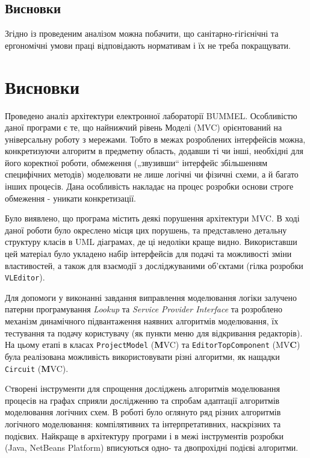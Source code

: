 \documentclass[12pt,a4paper]{article}
\begin{document}
\subsection{Висновки}
Згідно із проведеним аналізом можна побачити, що санітарно-гігієнічні та ергономічні умови праці відповідають нормативам і їх не треба покращувати. 

\clearpage
 
\section{Висновки}

Проведено аналіз архітектури електронної лабораторії BUMMEL. Особливістю даної програми є те, що найнижчий рівень Моделі (MVC) орієнтований на універсальну роботу з мережами. Тобто в межах розроблених інтерфейсів можна, конкретизуючи алгоритм в предметну область, додавши ті чи інші, необхідні для його коректної роботи, обмеження („звузивши“ інтерфейс збільшенням специфічних методів) моделювати не лише логічні чи фізичні схеми, а й багато інших процесів. Дана особливість накладає на процес розробки основи строге обмеження - уникати конкретизації.

Було виявлено, що програма містить деякі порушення архітектури MVC. В ході даної роботи було окреслено місця цих порушень, та представлено детальну структуру класів в UML діаграмах, де ці недоліки краще видно. Використавши цей матеріал було укладено набір інтерфейсів для подачі та можливості зміни властивостей, а також для взаємодії з досліджуваними об’єктами (гілка розробки \lstinline$VLEditor$).

Для допомоги у виконанні завдання виправлення моделювання логіки залучено патерни програмування \emph{Lookup} та \emph{Service Provider Interface} та розроблено механізм динамічного підвантаження наявних алгоритмів моделювання, їх тестування та подачу користувачу (як пункти меню для відкривання редакторів). На цьому етапі в класах \lstinline$ProjectModel$ (\textbf{M}VC) та \lstinline$EditorTopComponent$ (MV\textbf{C}) була реалізована можливість використовувати різні алгоритми, як нащадки \lstinline$Circuit$ (\textbf{M}VC).

Cтворені інструменти для спрощення досліджень алгоритмів моделювання процесів на графах сприяли дослідженню та спробам адаптації алгоритмів моделювання логічних схем. В роботі було оглянуто ряд різних алгоритмів логічного моделювання: компілятивних та інтерпретативних, наскрізних та подієвих. Найкраще в архітектуру програми і в межі інструментів розробки (Java, NetBeans Platform) вписуються одно- та двопрохідні подієві алгоритми.
\end{document}
